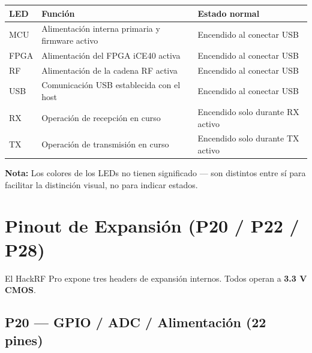 \documentclass[11pt]{article}
\begin{document}
\begin{table}[h]
    \centering
    \begin{tabular}{p{}p{}p{}}
        \toprule
        \textbf{LED} & \textbf{Función} & \textbf{Estado normal} \\
        \midrule
        MCU  & Alimentación interna primaria y firmware activo & Encendido al conectar USB \\
        FPGA & Alimentación del FPGA iCE40 activa             & Encendido al conectar USB \\
        RF   & Alimentación de la cadena RF activa             & Encendido al conectar USB \\
        USB  & Comunicación USB establecida con el host        & Encendido al conectar USB \\
        RX   & Operación de recepción en curso                 & Encendido solo durante RX activo \\
        TX   & Operación de transmisión en curso               & Encendido solo durante TX activo \\
        \bottomrule
    \end{tabular}
\end{table}

\textbf{Nota:} Los colores de los LEDs no tienen significado — son distintos entre sí para facilitar la distinción visual, no para indicar estados.

\section{Pinout de Expansión (P20 / P22 / P28)}

El HackRF Pro expone tres headers de expansión internos. Todos operan a \textbf{3.3 V CMOS}.

\subsection*{P20 — GPIO / ADC / Alimentación (22 pines)}
\end{document}
